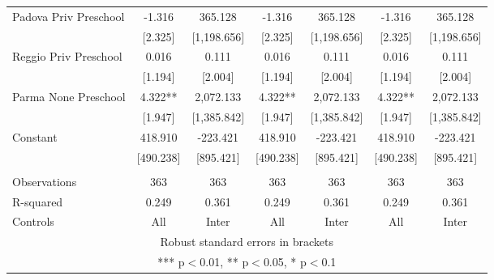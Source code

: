 \begin{tabular}{lcccccc}
Padova Priv Preschool & -1.316 & 365.128 & -1.316 & 365.128 & -1.316 & 365.128 \\
 & [2.325] & [1,198.656] & [2.325] & [1,198.656] & [2.325] & [1,198.656] \\
Reggio Priv Preschool & 0.016 & 0.111 & 0.016 & 0.111 & 0.016 & 0.111 \\
 & [1.194] & [2.004] & [1.194] & [2.004] & [1.194] & [2.004] \\
Parma None Preschool & 4.322** & 2,072.133 & 4.322** & 2,072.133 & 4.322** & 2,072.133 \\
 & [1.947] & [1,385.842] & [1.947] & [1,385.842] & [1.947] & [1,385.842] \\
Constant & 418.910 & -223.421 & 418.910 & -223.421 & 418.910 & -223.421 \\
 & [490.238] & [895.421] & [490.238] & [895.421] & [490.238] & [895.421] \\
 &  &  &  &  &  &  \\
Observations & 363 & 363 & 363 & 363 & 363 & 363 \\
R-squared & 0.249 & 0.361 & 0.249 & 0.361 & 0.249 & 0.361 \\
 Controls & All & Inter & All & Inter & All & Inter \\ \hline
\multicolumn{7}{c}{ Robust standard errors in brackets} \\
\multicolumn{7}{c}{ *** p$<$0.01, ** p$<$0.05, * p$<$0.1} \\
\end{tabular}
